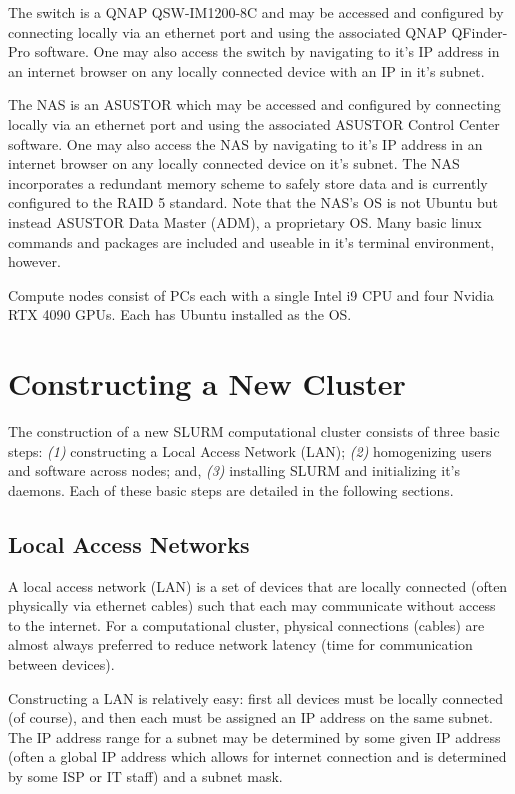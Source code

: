 \documentclass[]{article}
\begin{document}
The switch is a QNAP QSW-IM1200-8C and may be accessed and configured by connecting locally via an ethernet port and using the associated QNAP QFinder-Pro software. One may also access the switch by navigating to it's IP address in an internet browser on any locally connected device with an IP in it's subnet.

The NAS is an ASUSTOR which may be accessed and configured by connecting locally via an ethernet port and using the associated ASUSTOR Control Center software. One may also access the NAS by navigating to it's IP address in an internet browser on any locally connected device on it's subnet. The NAS incorporates a redundant memory scheme to safely store data and is currently configured to the RAID 5 standard. Note that the NAS's OS is not Ubuntu but instead ASUSTOR Data Master (ADM), a proprietary OS. Many basic linux commands and packages are included and useable in it's terminal environment, however.

Compute nodes consist of PCs each with a single Intel i9 CPU and four Nvidia RTX 4090 GPUs. Each has Ubuntu installed as the OS.




\section{Constructing a New Cluster}
The construction of a new SLURM computational cluster consists of three basic steps: \textit{(1)} constructing a Local Access Network (LAN); \textit{(2)} homogenizing users and software across nodes; and, \textit{(3)} installing SLURM and initializing it's daemons. Each of these basic steps are detailed in the following sections.

\subsection{Local Access Networks}
A local access network (LAN) is a set of devices that are locally connected (often physically via ethernet cables) such that each may communicate without access to the internet. For a computational cluster, physical connections (cables) are almost always preferred to reduce network latency (time for communication between devices).

Constructing a LAN is relatively easy: first all devices must be locally connected (of course), and then each must be assigned an IP address on the same subnet. The IP address range for a subnet may be determined by some given IP address (often a global IP address which allows for internet connection and is determined by some ISP or IT staff) and a subnet mask.
\end{document}

